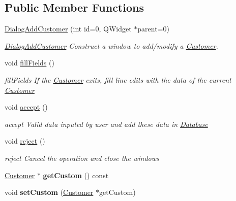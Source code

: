 \subsection*{Public Member Functions}
\begin{DoxyCompactItemize}
\item 
\hyperlink{classDialogAddCustomer_a6123adb32813c5ebe71ce06012c46b9c}{Dialog\-Add\-Customer} (int id=0, Q\-Widget $\ast$parent=0)
\begin{DoxyCompactList}\small\item\em \hyperlink{classDialogAddCustomer}{Dialog\-Add\-Customer} Construct a window to add/modify a \hyperlink{classCustomer}{Customer}. \end{DoxyCompactList}\item 
\hypertarget{classDialogAddCustomer_ae06c708abccad5ce0b8523c94b40eb75}{void \hyperlink{classDialogAddCustomer_ae06c708abccad5ce0b8523c94b40eb75}{fill\-Fields} ()}\label{classDialogAddCustomer_ae06c708abccad5ce0b8523c94b40eb75}

\begin{DoxyCompactList}\small\item\em fill\-Fields If the \hyperlink{classCustomer}{Customer} exits, fill line edits with the data of the current \hyperlink{classCustomer}{Customer} \end{DoxyCompactList}\item 
\hypertarget{classDialogAddCustomer_a1492352d114740bb44178f2415555155}{void \hyperlink{classDialogAddCustomer_a1492352d114740bb44178f2415555155}{accept} ()}\label{classDialogAddCustomer_a1492352d114740bb44178f2415555155}

\begin{DoxyCompactList}\small\item\em accept Valid data inputed by user and add these data in \hyperlink{classDatabase}{Database} \end{DoxyCompactList}\item 
\hypertarget{classDialogAddCustomer_a6affc8db156ee183ffd14a71d06a8534}{void \hyperlink{classDialogAddCustomer_a6affc8db156ee183ffd14a71d06a8534}{reject} ()}\label{classDialogAddCustomer_a6affc8db156ee183ffd14a71d06a8534}

\begin{DoxyCompactList}\small\item\em reject Cancel the operation and close the windows \end{DoxyCompactList}\item 
\hypertarget{classDialogAddCustomer_a65516413d3d3cb78acb03f5b45bc0278}{\hyperlink{classCustomer}{Customer} $\ast$ {\bfseries get\-Custom} () const }\label{classDialogAddCustomer_a65516413d3d3cb78acb03f5b45bc0278}

\item 
\hypertarget{classDialogAddCustomer_afde6fa7e1b2758d56f400fd719dfb603}{void {\bfseries set\-Custom} (\hyperlink{classCustomer}{Customer} $\ast$get\-Custom)}\label{classDialogAddCustomer_afde6fa7e1b2758d56f400fd719dfb603}

\end{DoxyCompactItemize}


